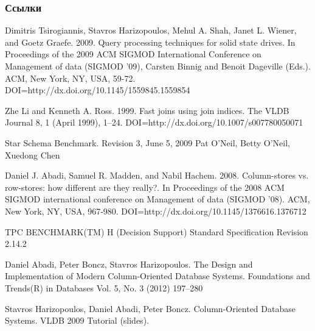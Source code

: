 \documentclass{beamer}
\begin{document}
\begin{frame}[allowframebreaks]
\frametitle{Ссылки}
\footnotesize{
\begin{thebibliography}{99}

  Dimitris Tsirogiannis, Stavros Harizopoulos, Mehul A. Shah, Janet L. Wiener, and Goetz Graefe. 2009. Query processing techniques for solid state drives. In Proceedings of the 2009 ACM SIGMOD International Conference on Management of data (SIGMOD '09), Carsten Binnig and Benoit Dageville (Eds.). ACM, New York, NY, USA, 59-72. DOI=http://dx.doi.org/10.1145/1559845.1559854 

 Zhe Li and Kenneth A. Ross. 1999. Fast joins using join indices. The VLDB Journal 8, 1 (April 1999), 1--24. DOI=http://dx.doi.org/10.1007/s007780050071 

 Star Schema Benchmark. Revision 3, June 5, 2009 Pat O'Neil, Betty O'Neil, Xuedong Chen

 Daniel J. Abadi, Samuel R. Madden, and Nabil Hachem. 2008. Column-stores vs. row-stores: how different are they really?. In Proceedings of the 2008 ACM SIGMOD international conference on Management of data (SIGMOD '08). ACM, New York, NY, USA, 967-980. DOI=http://dx.doi.org/10.1145/1376616.1376712 

 TPC BENCHMARK(TM) H (Decision Support) Standard Specification Revision 2.14.2

 Daniel Abadi, Peter Boncz, Stavros Harizopoulos. The Design and Implementation of Modern Column-Oriented Database Systems. Foundations and Trends(R) in Databases Vol. 5, No. 3 (2012) 197--280

 Stavros Harizopoulos, Daniel Abadi, Peter Boncz. Column-Oriented Database Systems. VLDB 2009 Tutorial (slides).





\end{thebibliography}}
\end{frame}
\end{document}

